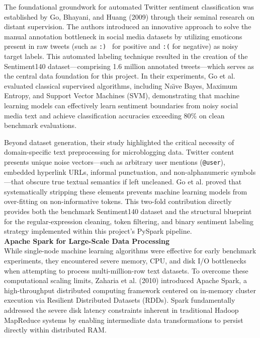 \documentclass[12pt,a4paper]{article}
\begin{document}
The foundational groundwork for automated Twitter sentiment classification was established by Go, Bhayani, and Huang (2009) through their seminal research on distant supervision. The authors introduced an innovative approach to solve the manual annotation bottleneck in social media datasets by utilizing emoticons present in raw tweets (such as \texttt{:) } for positive and \texttt{:(} for negative) as noisy target labels. This automated labeling technique resulted in the creation of the Sentiment140 dataset---comprising 1.6 million annotated tweets---which serves as the central data foundation for this project. In their experiments, Go et al. evaluated classical supervised algorithms, including Na\"{\i}ve Bayes, Maximum Entropy, and Support Vector Machines (SVM), demonstrating that machine learning models can effectively learn sentiment boundaries from noisy social media text and achieve classification accuracies exceeding 80\% on clean benchmark evaluations.

Beyond dataset generation, their study highlighted the critical necessity of domain-specific text preprocessing for microblogging data. Twitter content presents unique noise vectors---such as arbitrary user mentions (\texttt{@user}), embedded hyperlink URLs, informal punctuation, and non-alphanumeric symbols---that obscure true textual semantics if left uncleaned. Go et al. proved that systematically stripping these elements prevents machine learning models from over-fitting on non-informative tokens. This two-fold contribution directly provides both the benchmark Sentiment140 dataset and the structural blueprint for the regular-expression cleaning, token filtering, and binary sentiment labeling strategy implemented within this project's PySpark pipeline.\\

\textbf{Apache Spark for Large-Scale Data Processing}\\

While single-node machine learning algorithms were effective for early benchmark experiments, they encountered severe memory, CPU, and disk I/O bottlenecks when attempting to process multi-million-row text datasets. To overcome these computational scaling limits, Zaharia et al. (2010) introduced Apache Spark, a high-throughput distributed computing framework centered on in-memory cluster execution via Resilient Distributed Datasets (RDDs). Spark fundamentally addressed the severe disk latency constraints inherent in traditional Hadoop MapReduce systems by enabling intermediate data transformations to persist directly within distributed RAM.
\end{document}
